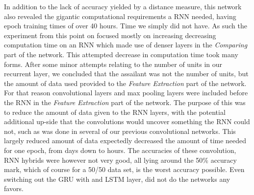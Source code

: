 In addition to the lack of accuracy yielded by a distance measure, this network
also revealed the gigantic computational requirements a \gls{RNN} needed,
having epoch training times of over 40 hours. Time we simply did not have. As
such the experiment from this point on focused mostly on increasing decreasing
computation time on an \gls{RNN} which made use of denser layers in the
\textit{Comparing} part of the network. This attempted decrease in computation
time took many forms. After some minor attempts relating to the number of units
in our recurrent layer, we concluded that the assailant was not the number of
units, but the amount of data used provided to the \textit{Feature Extraction}
part of the network. For that reason convolutional layers and max pooling layers
were included before the \gls{RNN} in the \textit{Feature Extraction} part of
the network. The purpose of this was to reduce the amount of data given to the
\gls{RNN} layers, with the potential additional up-side that the convolutions
would uncover something the \gls{RNN} could not, such as was done in several
of our previous convolutional networks. This largely reduced amount of data
expectedly decreased the amount of time needed for one epoch, from days down to
hours. The accuracies of these convolution, \gls{RNN} hybrids were however not
very good, all lying around the 50\% accuracy mark, which of course for a 50/50
data set, is the worst accuracy possible. Even switching out the \gls{GRU} with
and \gls{LSTM} layer, did not do the networks any favors.

